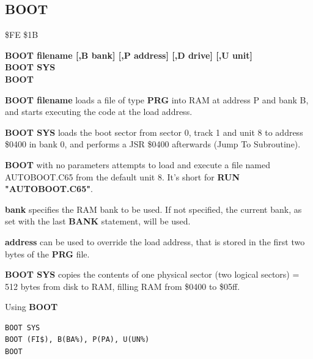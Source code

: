 
\newpage
\subsection{BOOT}
\begin{description}[leftmargin=2cm,style=nextline]
\item [Token:] \$FE \$1B
\item [Format:] {\bf BOOT filename [,B bank]
                [,P address]  [,D drive] [,U unit] } \\
                {\bf BOOT SYS} \\
                {\bf BOOT}
\item [Usage:]
   {\bf BOOT filename} loads a file of type
   {\bf PRG} into RAM at address P and bank B, and starts executing
   the code at the load address.

   {\bf BOOT SYS} loads the boot sector from sector 0,
   track 1 and unit 8 to address \$0400 in bank 0, and
   performs a JSR \$0400 afterwards (Jump To Subroutine).

   {\bf BOOT} with no parameters attempts to load
   and execute a file named AUTOBOOT.C65 from the default unit 8.
   It's short for {\bf RUN "AUTOBOOT.C65"}.

   \filenamedefinition

   {\bf bank} specifies the RAM bank to be used.
   If not specified, the current bank, as set with the last
   {\bf BANK} statement, will be used.

   {\bf address} can be used to override the load address,
   that is stored in the first two bytes of the {\bf PRG} file.

   \drivedefinition

   \unitdefinition

\item [Remarks:]
   {\bf BOOT SYS} copies the contents of one physical sector
   (two logical sectors) = 512 bytes from disk to RAM,
   filling RAM from \$0400 to \$05ff.

\item [Examples:] Using {\bf BOOT}
\begin{tcolorbox}[colback=black,coltext=white]
\verbatimfont{\codefont}
\begin{verbatim}
BOOT SYS
BOOT (FI$), B(BA%), P(PA), U(UN%)
BOOT
\end{verbatim}
\end{tcolorbox}
\end{description}

